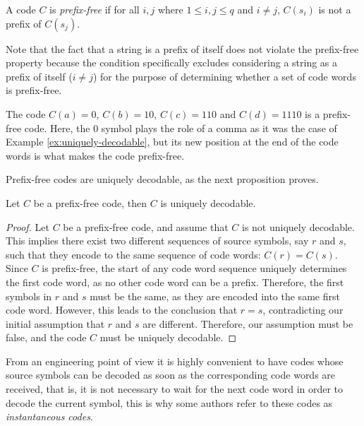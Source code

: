 \begin{definition}
\label{def:Prefix-free-Code}
A code $C$ is \emph{prefix-free} if for all $i, j$ where $1 \leq i, j \leq q$ and $i \neq j$, $C(s_i)$ is not a prefix of $C(s_j)$.
\end{definition}

Note that the fact that a string is a prefix of itself does not violate the prefix-free property because the condition specifically excludes considering a string as a prefix of itself ($i \neq j$) for the purpose of determining whether a set of code words is prefix-free.

\begin{example}
\label{ex:prefix-free}
The code $C(a)=0$, $C(b)=10$, $C(c)=110$ and $C(d)=1110$ is a prefix-free code. Here, the $0$ symbol plays the role of a comma as it was the case of Example \ref{ex:uniquely-decodable}, but its new position at the end of the code words is what makes the code prefix-free.
\end{example}

Prefix-free codes are uniquely decodable, as the next proposition proves.

\begin{proposition}
Let $C$ be a prefix-free code, then $C$ is uniquely decodable.
\end{proposition}
\begin{proof}
Let \( C \) be a prefix-free code, and assume that \( C \) is not uniquely decodable. This implies there exist two different sequences of source symbols, say \( r \) and \( s \), such that they encode to the same sequence of code words: \( C(r) = C(s) \). Since \( C \) is prefix-free, the start of any code word sequence uniquely determines the first code word, as no other code word can be a prefix. Therefore, the first symbols in \( r \) and \( s \) must be the same, as they are encoded into the same first code word. However, this leads to the conclusion that \( r = s \), contradicting our initial assumption that \( r \) and \( s \) are different. Therefore, our assumption must be false, and the code \( C \) must be uniquely decodable. 
\end{proof}

From an engineering point of view it is highly convenient to have codes whose source symbols can be decoded as soon as the corresponding code words are received, that is, it is not necessary to wait for the next code word in order to decode the current symbol, this is why some authors refer to these codes as \emph{instantaneous codes}.

